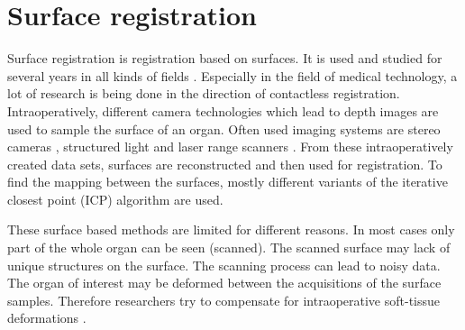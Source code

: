 
\section{Surface registration}
Surface registration is registration based on surfaces. It is used and studied
for several years in all kinds of fields \cite{ramos2015review}. Especially in
the field of medical technology, a lot of research is being done in the
direction of contactless registration. Intraoperatively, different camera technologies which lead
to depth images are used to sample the surface of an organ. Often used imaging systems are stereo cameras
\cite{furukawa2010accurate}, structured light \cite{salvi2004pattern} and
laser range scanners \cite{cash2003incorporation}. From these intraoperatively
created data sets, surfaces are reconstructed and then used for registration. To
find the mapping between the surfaces, mostly different variants of the iterative
closest point (ICP) \cite{besl1992method} algorithm are used. 

These surface based methods are limited for different reasons. In most cases
only part of the whole organ can be seen (scanned). The scanned surface may lack
of unique structures on the surface. The scanning process can 
lead to noisy data. The organ of interest may be deformed between the
acquisitions of the surface samples. Therefore researchers try to compensate for
intraoperative soft-tissue deformations \cite{cash2005compensating}\cite{dagon2008real}.


